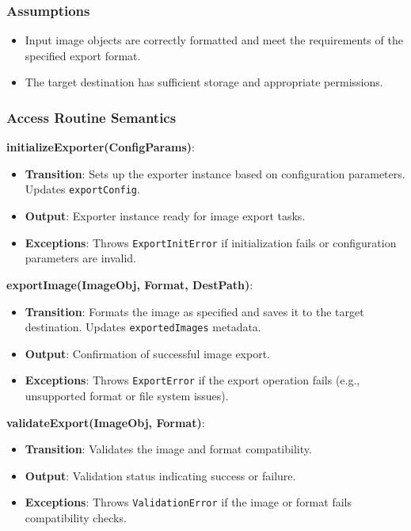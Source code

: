 \documentclass[12pt, titlepage]{article}
\begin{document}
\subsubsection{Assumptions}
\begin{itemize}
    \item Input image objects are correctly formatted and meet the requirements of the specified export format.
    \item The target destination has sufficient storage and appropriate permissions.
\end{itemize}

\subsubsection{Access Routine Semantics}

\textbf{initializeExporter(ConfigParams)}:
\begin{itemize}
    \item \textbf{Transition}: Sets up the exporter instance based on configuration parameters. Updates \texttt{exportConfig}.
    \item \textbf{Output}: Exporter instance ready for image export tasks.
    \item \textbf{Exceptions}: Throws \texttt{ExportInitError} if initialization fails or configuration parameters are invalid.
\end{itemize}

\textbf{exportImage(ImageObj, Format, DestPath)}:
\begin{itemize}
    \item \textbf{Transition}: Formats the image as specified and saves it to the target destination. Updates \texttt{exportedImages} metadata.
    \item \textbf{Output}: Confirmation of successful image export.
    \item \textbf{Exceptions}: Throws \texttt{ExportError} if the export operation fails (e.g., unsupported format or file system issues).
\end{itemize}

\textbf{validateExport(ImageObj, Format)}:
\begin{itemize}
    \item \textbf{Transition}: Validates the image and format compatibility.
    \item \textbf{Output}: Validation status indicating success or failure.
    \item \textbf{Exceptions}: Throws \texttt{ValidationError} if the image or format fails compatibility checks.
\end{itemize}
\newpage
\end{document}
